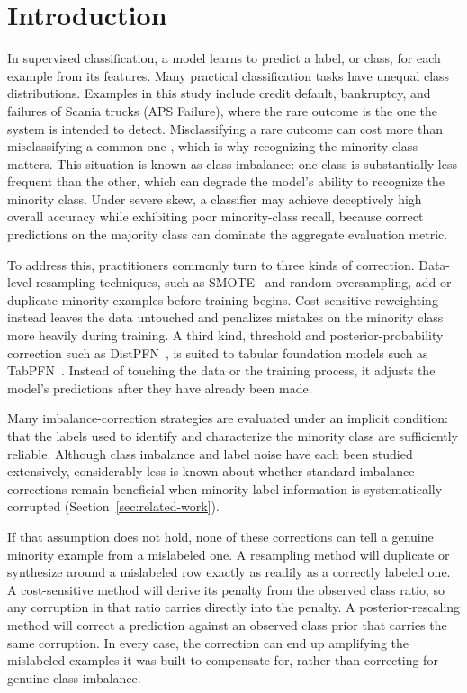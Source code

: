 \section{Introduction}
\label{sec:introduction}

In supervised classification, a model learns to predict a label, or class, for
each example from its features. Many practical
classification tasks have unequal class distributions. Examples in this study
include credit default, bankruptcy, and failures of Scania trucks (APS Failure),
where the rare outcome is the one the system is intended to detect. Misclassifying
a rare outcome can cost more than misclassifying a common one
\cite{elkan2001costsensitive}, which is why recognizing the minority class
matters. This situation is known as class imbalance: one class is substantially less frequent
than the other, which can degrade the model's ability to recognize the minority
class. Under severe skew, a classifier may achieve deceptively high overall
accuracy while exhibiting poor minority-class recall, because correct
predictions on the majority class can dominate the aggregate evaluation metric.

To address this, practitioners commonly turn to three kinds of correction.
Data-level resampling techniques, such as SMOTE~\cite{chawla2002smote} and random
oversampling, add or duplicate minority examples before training begins.
Cost-sensitive reweighting~\cite{elkan2001costsensitive} instead leaves the data
untouched and penalizes mistakes on the minority class more heavily during
training. A third kind, threshold and posterior-probability correction such as
DistPFN~\cite{lee2026distpfn}, is suited to tabular foundation models such as
TabPFN~\cite{hollmann2023tabpfn,hollmann2025tabpfnv2}. Instead of touching the data
or the training process, it adjusts the model's predictions after they have
already been made.

Many imbalance-correction strategies are evaluated under an implicit condition:
that the labels used to identify and characterize the minority class are
sufficiently reliable. Although class imbalance and label noise have each been
studied extensively, considerably less is known about whether standard imbalance
corrections remain beneficial when minority-label information is systematically
corrupted (Section~\ref{sec:related-work}).

If that assumption does not hold, none of these corrections can tell a genuine
minority example from a mislabeled one. A resampling method will duplicate or
synthesize around a mislabeled row exactly as readily as a correctly labeled one. A
cost-sensitive method will derive its penalty from the observed class ratio, so any
corruption in that ratio carries directly into the penalty. A posterior-rescaling
method will correct a prediction against an observed class prior that carries the
same corruption. In every case, the correction can end up amplifying the
mislabeled examples it was built to compensate for, rather than correcting for
genuine class imbalance.

